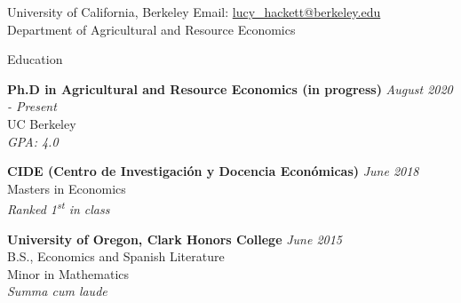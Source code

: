 \documentclass{resume} %
\begin{document}
\begin{rSection}{}
University of California, Berkeley \hfill Email:  \href{mailto:lucy\_hackett@berkeley.edu}{lucy\_hackett@berkeley.edu}\\
Department of Agricultural and Resource Economics \\
\end{rSection}


\begin{rSection}{Education}

{\bf Ph.D in Agricultural and Resource Economics (in progress)} \hfill {\em August 2020 - Present} 
\\ UC Berkeley\hfill \\
\textit{GPA: 4.0}
\vspace{0.1cm}

{\bf CIDE (Centro de Investigación y Docencia Económicas)} \hfill {\em June 2018} 
\\ Masters in Economics\hfill\\
\textit{Ranked 1\textsuperscript{st} in class}
\vspace{0.1cm}

{\bf University of Oregon, Clark Honors College} \hfill {\em June 2015} 
\\ B.S., Economics and Spanish Literature  \hfill
\\ Minor in Mathematics \hfill 
\\ 
\textit{Summa cum laude}



\end{rSection}
\end{document}
